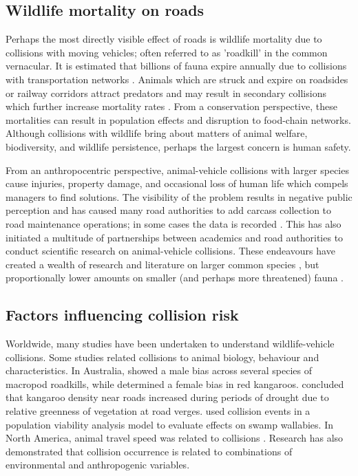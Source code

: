 \subsection{Wildlife mortality on roads}

Perhaps the most directly visible effect of roads is wildlife mortality due to collisions with moving vehicles; often referred to as 'roadkill' in the common vernacular.  It is estimated that billions of fauna expire annually due to collisions with transportation networks \citep{seil06}.  Animals which are struck and expire on roadsides or railway corridors attract predators and may result in secondary collisions which further increase mortality rates \citep{spel98}.  From a conservation perspective, these mortalities can result in population effects and disruption to food-chain networks.  Although collisions with wildlife bring about matters of animal welfare, biodiversity, and wildlife persistence, perhaps the largest concern is human safety. 

From an anthropocentric perspective, animal-vehicle collisions with larger species cause injuries, property damage, and occasional loss of human life which compels managers to find solutions. The visibility of the problem results in negative public perception and has caused many road authorities to add carcass collection to road maintenance operations; in some cases the data is recorded \citep{huij07a}. This has also initiated a multitude of partnerships between academics and road authorities to conduct scientific research on animal-vehicle collisions.  These endeavours have created a wealth of research and literature on larger common species \citep{biss08,clev01,romi96,sudh09}, but proportionally lower amounts on smaller (and perhaps more threatened) fauna \citep{clev03}.

\subsection{Factors influencing collision risk}

Worldwide, many studies have been undertaken to understand wildlife-vehicle collisions.  Some studies related collisions to animal biology, behaviour and characteristics.  In Australia, \cite{coul97} showed a male bias across several species of macropod roadkills, while \cite{kloc06} determined a female bias in red kangaroos.  \cite{lee04} concluded that kangaroo density near roads increased during periods of drought due to relative greenness of vegetation at road verges. \cite{ramp06b} used collision events in a population viability analysis model to evaluate effects on swamp wallabies.  In North America, animal travel speed was related to collisions \citep{litv08}. Research has also demonstrated that collision occurrence is related to combinations of environmental and anthropogenic variables\citep{barn07}.

